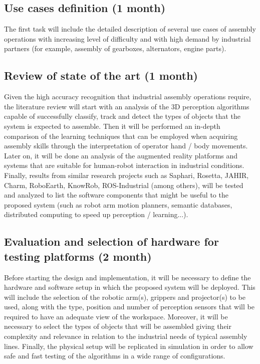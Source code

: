 \subsection{Use cases definition (1 month)}

The first task will include the detailed description of several use cases of assembly operations with increasing level of difficulty and with high demand by industrial partners (for example, assembly of gearboxes, alternators, engine parts).


\subsection{Review of state of the art (1 month)}

Given the high accuracy recognition that industrial assembly operations require, the literature review will start with an analysis of the 3D perception algorithms capable of successfully classify, track and detect the types of objects that the system is expected to assemble. Then it will be performed an in-depth comparison of the learning techniques that can be employed when acquiring assembly skills through the interpretation of operator hand / body movements. Later on, it will be done an analysis of the augmented reality platforms and systems that are suitable for human-robot interaction in industrial conditions.
Finally, results from similar research projects such as Saphari, Rosetta, JAHIR, Charm, RoboEarth, KnowRob, ROS-Industrial (among others), will be tested and analyzed to list the software components that might be useful to the proposed system (such as robot arm motion planners, semantic databases, distributed computing to speed up perception / learning...).


\subsection{Evaluation and selection of hardware for testing platforms (2 month)}

Before starting the design and implementation, it will be necessary to define the hardware and software setup in which the proposed system will be deployed. This will include the selection of the robotic arm(s), grippers and projector(s) to be used, along with the type, position and number of perception sensors that will be required to have an adequate view of the workspace. Moreover, it will be necessary to select the types of objects that will be assembled giving their complexity and relevance in relation to the industrial needs of typical assembly lines.
Finally, the physical setup will be replicated in simulation in order to allow safe and fast testing of the algorithms in a wide range of configurations.


